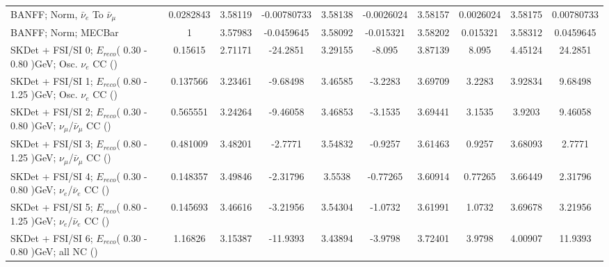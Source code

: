 {\begin{landscape}
\begin{table}
{\begin{tabular}{| l | S | S  S | S  S | S  S | S  S | }
      BANFF; Norm, $\bar{\nu}_{e}$ To $\bar{\nu}_{\mu}$ &       0.0282843 &         3.58119 &     -0.00780733 &         3.58138 &      -0.0026024 &         3.58157 &       0.0026024 &         3.58175 &      0.00780733 \\ 
      BANFF; Norm; MECBar                               &               1 &         3.57983 &      -0.0459645 &         3.58092 &       -0.015321 &         3.58202 &        0.015321 &         3.58312 &       0.0459645 \\ 
      SKDet + FSI/SI  0; $E_{reco}$( 0.30 - 0.80 )GeV; Osc. $\nu_{e}$ CC (\nueCConepi{})                &         0.15615 &         2.71171 &        -24.2851 &         3.29155 &          -8.095 &         3.87139 &           8.095 &         4.45124 &         24.2851 \\ 
      SKDet + FSI/SI  1; $E_{reco}$( 0.80 - 1.25 )GeV; Osc. $\nu_{e}$ CC (\nueCConepi{})                &        0.137566 &         3.23461 &        -9.68498 &         3.46585 &         -3.2283 &         3.69709 &          3.2283 &         3.92834 &         9.68498 \\ 
      SKDet + FSI/SI  2; $E_{reco}$( 0.30 - 0.80 )GeV; $\nu_{\mu}$/$\bar{\nu}_{\mu}$ CC (\nueCConepi{}) &        0.565551 &         3.24264 &        -9.46058 &         3.46853 &         -3.1535 &         3.69441 &          3.1535 &          3.9203 &         9.46058 \\ 
      SKDet + FSI/SI  3; $E_{reco}$( 0.80 - 1.25 )GeV; $\nu_{\mu}$/$\bar{\nu}_{\mu}$ CC (\nueCConepi{}) &        0.481009 &         3.48201 &         -2.7771 &         3.54832 &         -0.9257 &         3.61463 &          0.9257 &         3.68093 &          2.7771 \\ 
      SKDet + FSI/SI  4; $E_{reco}$( 0.30 - 0.80 )GeV; $\nu_{e}$/$\bar{\nu}_{e}$ CC (\nueCConepi{})     &        0.148357 &         3.49846 &        -2.31796 &          3.5538 &        -0.77265 &         3.60914 &         0.77265 &         3.66449 &         2.31796 \\ 
      SKDet + FSI/SI  5; $E_{reco}$( 0.80 - 1.25 )GeV; $\nu_{e}$/$\bar{\nu}_{e}$ CC (\nueCConepi{})     &        0.145693 &         3.46616 &        -3.21956 &         3.54304 &         -1.0732 &         3.61991 &          1.0732 &         3.69678 &         3.21956 \\ 
      SKDet + FSI/SI  6; $E_{reco}$( 0.30 - 0.80 )GeV; all NC (\nueCConepi{})                           &         1.16826 &         3.15387 &        -11.9393 &         3.43894 &         -3.9798 &         3.72401 &          3.9798 &         4.00907 &         11.9393 \\ 

\end{tabular}}
\end{table}
\end{landscape}}
